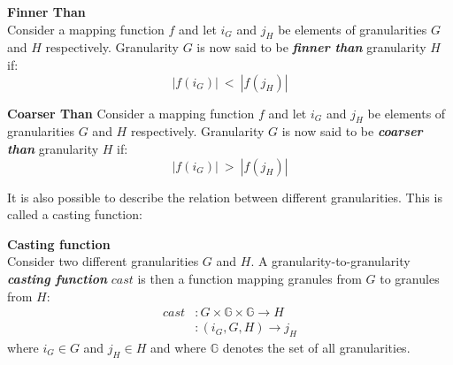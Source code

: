 \begin{svgraybox}
\vspace{-10pt}
\begin{definition}\textbf{Finner Than}\\
Consider a mapping function $f$ and let $i_G$ and $j_H$ be elements of granularities $G$ and $H$ respectively. Granularity $G$ is now said to be \emph{\textbf{finner than}} granularity $H$ if:
\begin{equation}
\label{eq:finner-than}
| f \left( i_G \right) |\ <\ |  f \left( j_H \right)| \nonumber
\end{equation} 
\end{definition}

\begin{definition}
\label{def:coarser-than}\textbf{Coarser Than}
Consider a mapping function $f$ and let $i_G$ and $j_H$ be elements of granularities $G$ and $H$ respectively. Granularity $G$ is now said to be \emph{\textbf{coarser than}} granularity $H$ if:
\begin{equation}
\label{eq:coarser-than}
| f \left( i_G \right)|\ >\ |  f \left( j_H \right)| \nonumber
\end{equation} 
\end{definition}
\vspace{-10pt}
\end{svgraybox}

It is also possible to describe the relation between different granularities. This is called a casting function:
\begin{svgraybox}
\vspace{-10pt}
\begin{definition}
\textbf{Casting function}~\cite{Lin97}\\
\label{def:casting-fucntion}
Consider two different granularities $G$ and $H$. A granularity-to-granularity \emph{\textbf{casting function}} $cast$ is then a function mapping granules from $G$ to granules from $H$: 
\begin{align}
\label{eq:cast-function}
cast & : G \times \mathbb{G} \times \mathbb{G} \rightarrow H \nonumber\\
		 & : (i_{G}, G, H) \rightarrow j_{H} \nonumber
\end{align}
where $i_{G} \in G$ and $j_{H} \in H$ and where $\mathbb{G}$ denotes the set of all granularities.
\end{definition}
\vspace{-10pt}
\end{svgraybox}


